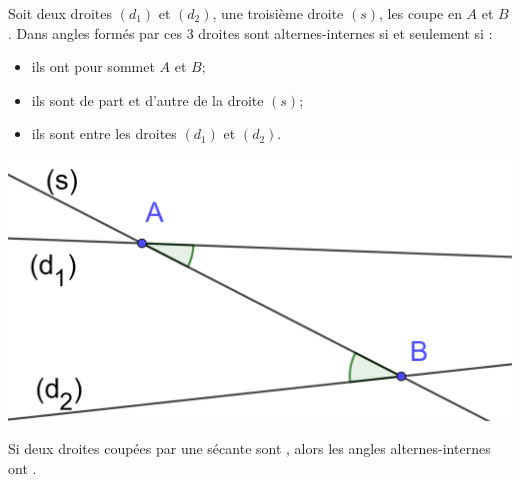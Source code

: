 \documentclass[12pt,a4paper]{article}
\begin{document}
\begin{mydef}
	
	
		Soit deux droites $(d_1)$ et $(d_2)$, une troisième droite $(s)$, les coupe en $A$ et $B$.
		Dans angles formés par ces 3 droites sont alternes-internes si et seulement si :
		
		\begin{multicols}{2}
		\begin{itemize}
			\item ils ont pour sommet $A$ et $B$;
			\item ils sont de part et d'autre de la droite $(s)$;
			\item ils sont entre les droites $(d_1)$ et $(d_2)$.
		\end{itemize}
	
	
		\begin{center}
			\includegraphics[scale=0.14]{alt_int}
		\end{center}
	\end{multicols}

\end{mydef}


\begin{myprop}
	Si deux droites coupées par une sécante sont \hspace*{4cm}, alors les angles alternes-internes ont \hspace*{5cm}.
\end{myprop}
\end{document}
